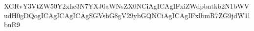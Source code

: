 XGRvY3VtZW50Y2xhc3N7YXJ0aWNsZX0NCiAgICAgIFxiZWdpbntkb2N1bWVudH0gDQogICAgICAgICAgSGVsbG8gV29ybGQNCiAgICAgIFxlbmR7ZG9jdW1lbnR9